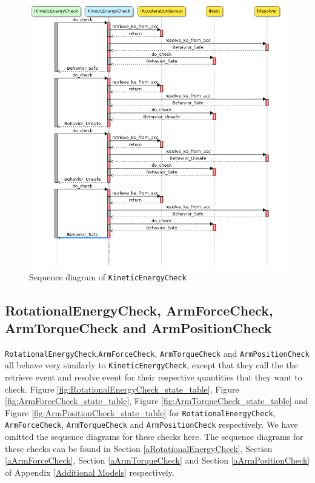 \documentclass[12pt]{scrreprt}
\begin{document}
\begin{figure}[H]
    \centering
    \includegraphics[width=\textwidth]{Figures/results/modelling_figures/KineticEnergyCheck/KineticEnergyCheck_seq.png}
    \caption{Sequence diagram of \texttt{KineticEnergyCheck}}
    \label{fig:kineticenergycheck_seq}
\end{figure}

\subsection{RotationalEnergyCheck, ArmForceCheck, ArmTorqueCheck and ArmPositionCheck}
\texttt{RotationalEnergyCheck},\texttt{ArmForceCheck}, \texttt{ArmTorqueCheck} and \texttt{ArmPositionCheck} all behave very similarly to \texttt{KineticEnergyCheck}, except that they call the the retrieve event and resolve event for their respective quantities that they want to check. Figure \ref{fig:RotationalEnergyCheck_state_table}, Figure \ref{fig:ArmForceCheck_state_table}, Figure \ref{fig:ArmTorqueCheck_state_table} and Figure \ref{fig:ArmPositionCheck_state_table} for \texttt{RotationalEnergyCheck}, \\\texttt{ArmForceCheck}, \texttt{ArmTorqueCheck} and \texttt{ArmPositionCheck} respectively. We have omitted the sequence diagrams for these checks here. The sequence diagrams for these checks can be found in Section \ref{aRotationalEnergyCheck}, Section \ref{aArmForceCheck}, Section \ref{aArmTorqueCheck} and Section \ref{aArmPositionCheck} of Appendix \ref{Additional Models} respectively.
\end{document}
